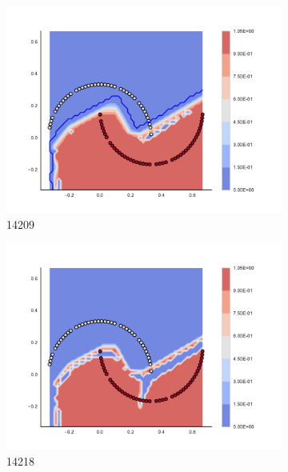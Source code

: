 \begin{figure}[h]
\begin{subfigure}[b]{0.09\textwidth}
    \includegraphics[clip, trim=2.35cm 1.75cm 4.5cm 0cm,width=\textwidth]{img/convergence/14209.pdf}
    \caption{14209}
    \label{fig:convergence_14209}
\end{subfigure}
%
\begin{subfigure}[b]{0.09\textwidth}
    \includegraphics[clip, trim=2.35cm 1.75cm 4.5cm 0cm,width=\textwidth]{img/convergence/14218.pdf}
    \caption{14218}
    \label{fig:convergence_14218}
\end{subfigure}
%
\begin{subfigure}[b]{0.09\textwidth}

\end{subfigure}
\end{figure}
